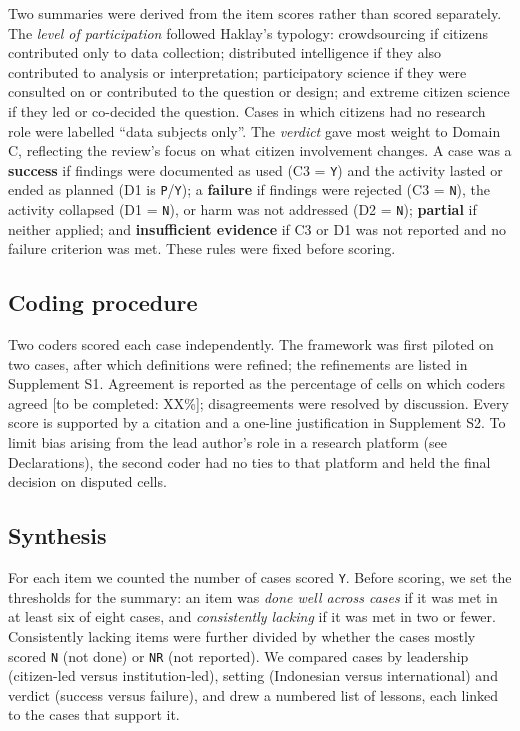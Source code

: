 \documentclass[
  number,
  preprint]{elsarticle}
\begin{document}
Two summaries were derived from the item scores rather than scored
separately. The \emph{level of participation} followed Haklay's
typology: crowdsourcing if citizens contributed only to data collection;
distributed intelligence if they also contributed to analysis or
interpretation; participatory science if they were consulted on or
contributed to the question or design; and extreme citizen science if
they led or co-decided the question. Cases in which citizens had no
research role were labelled ``data subjects only''. The \emph{verdict}
gave most weight to Domain C, reflecting the review's focus on what
citizen involvement changes. A case was a \textbf{success} if findings
were documented as used (C3 = \texttt{Y}) and the activity lasted or
ended as planned (D1 is \texttt{P}/\texttt{Y}); a \textbf{failure} if
findings were rejected (C3 = \texttt{N}), the activity collapsed (D1 =
\texttt{N}), or harm was not addressed (D2 = \texttt{N});
\textbf{partial} if neither applied; and \textbf{insufficient evidence}
if C3 or D1 was not reported and no failure criterion was met. These
rules were fixed before scoring.

\subsection{Coding procedure}\label{coding-procedure}

Two coders scored each case independently. The framework was first
piloted on two cases, after which definitions were refined; the
refinements are listed in Supplement S1. Agreement is reported as the
percentage of cells on which coders agreed {[}to be completed: XX\%{]};
disagreements were resolved by discussion. Every score is supported by a
citation and a one-line justification in Supplement S2. To limit bias
arising from the lead author's role in a research platform (see
Declarations), the second coder had no ties to that platform and held
the final decision on disputed cells.

\subsection{Synthesis}\label{synthesis}

For each item we counted the number of cases scored \texttt{Y}. Before
scoring, we set the thresholds for the summary: an item was \emph{done
well across cases} if it was met in at least six of eight cases, and
\emph{consistently lacking} if it was met in two or fewer. Consistently
lacking items were further divided by whether the cases mostly scored
\texttt{N} (not done) or \texttt{NR} (not reported). We compared cases
by leadership (citizen-led versus institution-led), setting (Indonesian
versus international) and verdict (success versus failure), and drew a
numbered list of lessons, each linked to the cases that support it.
\end{document}
